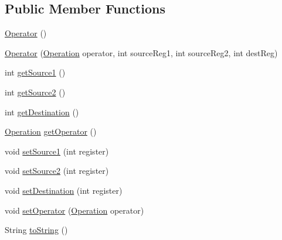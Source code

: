 \subsection*{Public Member Functions}
\begin{DoxyCompactItemize}
\item 
\hyperlink{classcas_1_1instruction_1_1_operator_ac16250f07e727c330a3d9037ff5ac9d2}{Operator} ()
\item 
\hyperlink{classcas_1_1instruction_1_1_operator_a7f08029e4d41bfb5483622e2fdeeef9c}{Operator} (\hyperlink{enumcas_1_1instruction_1_1_operator_1_1_operation}{Operation} operator, int source\-Reg1, int source\-Reg2, int dest\-Reg)
\item 
int \hyperlink{classcas_1_1instruction_1_1_operator_a6e923a661ff6a8294041191d5a6ec09a}{get\-Source1} ()
\item 
int \hyperlink{classcas_1_1instruction_1_1_operator_a89b4ad47d31879f8fe534d8dbd85be35}{get\-Source2} ()
\item 
int \hyperlink{classcas_1_1instruction_1_1_operator_a5820e4ce3a2ee8410fb0c83a512ad75e}{get\-Destination} ()
\item 
\hyperlink{enumcas_1_1instruction_1_1_operator_1_1_operation}{Operation} \hyperlink{classcas_1_1instruction_1_1_operator_a3551a41353847f24bc0ca7c246f47c41}{get\-Operator} ()
\item 
void \hyperlink{classcas_1_1instruction_1_1_operator_ae78c6c483f462a7553f1a0987e61da1f}{set\-Source1} (int register)
\item 
void \hyperlink{classcas_1_1instruction_1_1_operator_a195d3393c823d89381ed52ed2b35e38f}{set\-Source2} (int register)
\item 
void \hyperlink{classcas_1_1instruction_1_1_operator_a6fa80593835e531c41f99605bb2f8e25}{set\-Destination} (int register)
\item 
void \hyperlink{classcas_1_1instruction_1_1_operator_aa5528da7f56e42e13586bdee4d989961}{set\-Operator} (\hyperlink{enumcas_1_1instruction_1_1_operator_1_1_operation}{Operation} operator)
\item 
String \hyperlink{classcas_1_1instruction_1_1_operator_ab1afc1c71ba03a2530da0262f38de8b8}{to\-String} ()
\end{DoxyCompactItemize}



